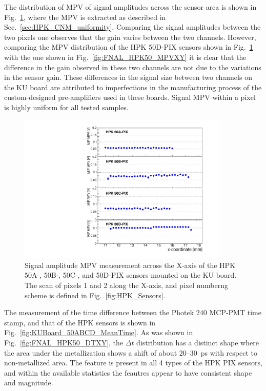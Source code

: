 \documentclass[preprint,1p]{elsarticle}
\begin{document}
The distribution of MPV of signal amplitudes across the sensor area is shown in
Fig.~\ref{fig:KUBoard_50ABCD_MPV}, where the MPV is extracted as described in
Sec.~\ref{sec:HPK_CNM_uniformity}. Comparing the signal amplitudes between the
two pixels one observes that the gain varies between the two channels. However,
comparing the MPV distribution of the HPK 50D-PIX sensors shown in
Fig.~\ref{fig:KUBoard_50ABCD_MPV} with the one shown in
Fig.~\ref{fig:FNAL_HPK50_MPVXY} it is clear that the difference in the gain
observed in these two channels are not due to the variations in the sensor gain.
These differences in the signal size between two channels on the KU board are
attributed to imperfections in the manufacturing process of the custom-designed
pre-amplifiers used in these boards. Signal MPV within a pixel is highly uniform
for all tested samples. 

\begin{figure}[htbp] 
\centering
\includegraphics[width=0.9\textwidth]{figs/KUBoard_HPK50ABCD/KUBoard_50ABCD_MPV.pdf} 
\caption{Signal amplitude MPV measurement across the X-axis of the HPK 50A-, 50B-, 50C-, and 50D-PIX sensors mounted on the KU board. The scan of pixels 1 and 2 along the X-axis, and pixel numberng scheme is defined in Fig.~\ref{fig:HPK_Sensors}.} 
\label{fig:KUBoard_50ABCD_MPV} 
\end{figure} 

The measurement of the time difference between the Photek 240 MCP-PMT time
stamp, and that of the HPK sensors is shown in
Fig.~\ref{fig:KUBoard_50ABCD_MeanTime}. As was shown in
Fig.~\ref{fig:FNAL_HPK50_DTXY}, the $\Delta t$ distribution has a distinct shape
where the area under the metallization shows a shift of about $20$--$30$~ps with
respect to non-metallized area. The feature is present in all 4 types of the HPK
PIX sensors, and within the available statistics the feautres appear to have
consistent shape and magnitude. 
\end{document}
